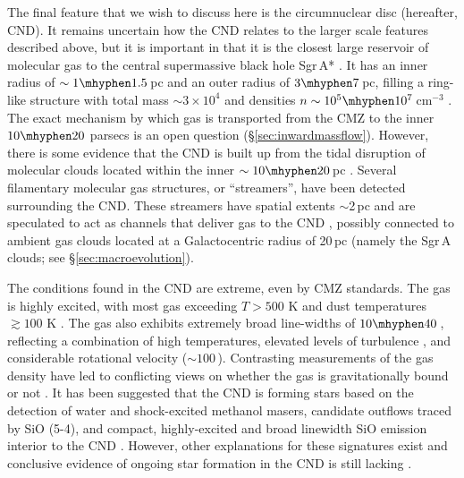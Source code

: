 The final feature that we wish to discuss here is the circumnuclear disc (hereafter, CND). It remains uncertain how the CND relates to the larger scale features described above, but it is important in that it is the closest large reservoir of molecular gas to the central supermassive black hole Sgr\,A* \citep{Genzel1985,Guesten1987, Jackson1993}.  
It has an inner radius of $\sim1\mhyphen1.5$\,pc and an outer radius of $3\mhyphen7$\,pc, filling a ring-like structure with total mass $\sim3\times10^4$ \msun and densities $n\sim10^5\mhyphen10^7$\,cm$^{-3}$ \citep{Etxaluze2011,Oka2011,Mills2013,Tsuboi2018}. 
The exact mechanism by which gas is transported from the CMZ to the inner $10\mhyphen20$ parsecs is an open question (\S\ref{sec:inwardmassflow}). 
However, there is some evidence that the CND is built up from the tidal disruption of molecular clouds located within the inner $\sim10\mhyphen20$\,pc \citep{Ho1991,Coil2000, McGary2001, Martin2012,Mapelli2016,Hsieh2017,Hsieh2019, Tsuboi2018, Ballone2019}. 
Several filamentary molecular gas structures, or ``streamers'', have been detected surrounding the CND. These streamers have spatial extents $\sim$2\,pc and are speculated to act as channels that deliver gas to the CND \citep{Montero-Castano2009, Hsieh2017, Takekawa2017b}, possibly connected to ambient gas clouds located at a Galactocentric radius of 20\,pc (namely the Sgr\,A clouds; see \S\ref{sec:macroevolution}). 

The conditions found in the CND are extreme, even by CMZ standards.
The gas is highly excited, with most gas exceeding $T>500$ K and dust temperatures $\gtrsim 100$ K \citep{Bradford2005,Lau2013,Mills2013,Mills2017a,James2021}. The gas also exhibits extremely broad line-widths of $10\mhyphen40$\,\kms, reflecting a combination of high temperatures, elevated levels of turbulence \citep{Goicoechea2018, Tsuboi2018, Hsieh2021}, and considerable rotational velocity ($\sim100$\,\kms). 
Contrasting measurements of the gas density have led to conflicting views on whether the gas is gravitationally bound or not \citep{Christopher2005, Montero-Castano2009, Requena-Torres2012}. 
It has been suggested that the CND is forming stars based on the detection of water and shock-excited methanol masers, candidate outflows traced by SiO (5-4), and compact, highly-excited and broad linewidth SiO emission interior to the CND \citep{Yusef-Zadeh2013a,Yusef-Zadeh2015b}. 
However, other explanations for these signatures exist and conclusive evidence of ongoing star formation in the CND is still lacking \citep{Mills2017a}.

